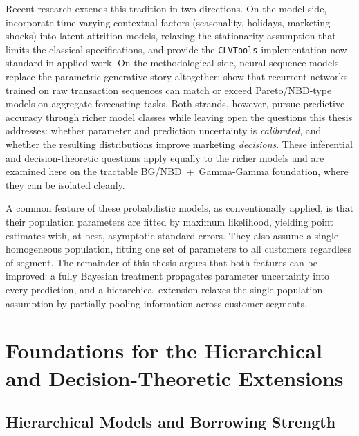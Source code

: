 \documentclass[12pt, a4paper, oneside]{report}
\begin{document}
Recent research extends this tradition in two directions. On the model side, \textcite{bachmann2021} incorporate time-varying contextual factors (seasonality, holidays, marketing shocks) into latent-attrition models, relaxing the stationarity assumption that limits the classical specifications, and provide the \texttt{CLVTools} implementation now standard in applied work. On the methodological side, neural sequence models replace the parametric generative story altogether: \textcite{valendin2022} show that recurrent networks trained on raw transaction sequences can match or exceed Pareto/NBD-type models on aggregate forecasting tasks. Both strands, however, pursue predictive accuracy through richer model classes while leaving open the questions this thesis addresses: whether parameter and prediction uncertainty is \emph{calibrated}, and whether the resulting distributions improve marketing \emph{decisions}. These inferential and decision-theoretic questions apply equally to the richer models and are examined here on the tractable BG/NBD~$+$~Gamma-Gamma foundation, where they can be isolated cleanly.

A common feature of these probabilistic models, as conventionally applied, is that their population parameters are fitted by maximum likelihood, yielding point estimates with, at best, asymptotic standard errors. They also assume a single homogeneous population, fitting one set of parameters to all customers regardless of segment. The remainder of this thesis argues that both features can be improved: a fully Bayesian treatment propagates parameter uncertainty into every prediction, and a hierarchical extension relaxes the single-population assumption by partially pooling information across customer segments.

\section{Foundations for the Hierarchical and Decision-Theoretic Extensions}
\label{sec:foundations-h2h3}

\subsection{Hierarchical Models and Borrowing Strength}
\label{sec:hier-review}
\end{document}
